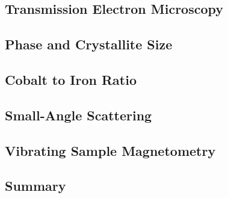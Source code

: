 \documentclass[\main/dresen_thesis.tex]{subfiles}
\renewcommand{\thisPath}{\main/chapters/monolayers/nanoparticles/}
\begin{document}
  \label{sec:monolayers:nanoparticles}

  \subsection{Transmission Electron Microscopy}
    
      \FloatBarrier

  \subsection{Phase and Crystallite Size}
  
    \FloatBarrier

  \subsection{Cobalt to Iron Ratio}
  
    \FloatBarrier

  \subsection{Small-Angle Scattering}
  
    \FloatBarrier

  \subsection{Vibrating Sample Magnetometry}
  
    \FloatBarrier

  \subsection{Summary}
  
    \FloatBarrier
\end{document}
